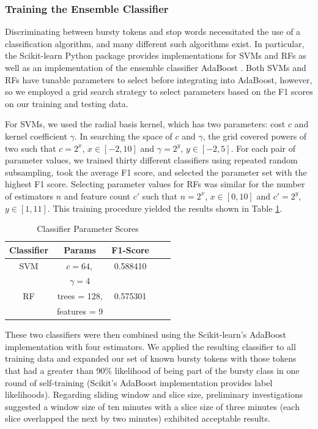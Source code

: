 \documentclass{sig-alternate}
\begin{document}
\subsubsection{Training the Ensemble Classifier}

Discriminating between bursty tokens and stop words necessitated the use of a classification algorithm, and many different such algorithms exist.
In particular, the Scikit-learn Python package provides implementations for SVMs and RFs as well as an implementation of the ensemble classifier AdaBoost \cite{scikit-learn}.
Both SVMs and RFs have tunable parameters to select before integrating into AdaBoost, however, so we employed a grid search strategy to select parameters based on the F1 scores on our training and testing data.

For SVMs, we used the radial basis kernel, which has two parameters: cost $c$ and kernel coefficient $\gamma$.
In searching the space of $c$ and $\gamma$, the grid covered powers of two such that $c = 2^x$, $x \in [-2, 10]$ and $\gamma = 2^y$, $y \in [-2, 5]$.
For each pair of parameter values, we trained thirty different classifiers using repeated random subsampling, took the average F1 score, and selected the parameter set with the highest F1 score.
Selecting parameter values for RFs was similar for the number of estimators $n$ and feature count $c'$ such that $n = 2^x$, $x \in [0, 10]$ and $c' = 2^y$, $y \in [1, 11]$.
This training procedure yielded the results shown in Table \ref{tab:scores}.

\begin{table}[htdp]
\caption{Classifier Parameter Scores}
\begin{center}
\begin{tabular}{|c|c|c|c|c|}
\hline
\textbf{Classifier} & \textbf{Params} & \textbf{F1-Score} \\ \hline
SVM & $c=64,$ & 0.588410 \\ 
& $\gamma=4$ & \\ \hline
RF & trees = 128, & 0.575301 \\
& features = 9 &  \\ \hline
\end{tabular}
\end{center}
\label{tab:scores}
\end{table}

These two classifiers were then combined using the Scikit-learn's AdaBoost implementation with four estimators.
We applied the resulting classifier to all training data and expanded our set of known bursty tokens with those tokens that had a greater than 90\% likelihood of being part of the bursty class in one round of self-training (Scikit's AdaBoost implementation provides label likelihoods).
Regarding sliding window and slice size, preliminary investigations suggested a window size of ten minutes with a slice size of three minutes (each slice overlapped the next by two minutes) exhibited acceptable results.
\end{document}
